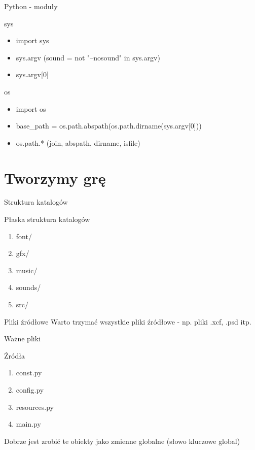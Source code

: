 \documentclass{beamer}
\begin{document}
\begin{frame}{Python - moduły}
  \begin{block}{sys}
    \begin{itemize}
    \item import sys
    \item sys.argv (sound = not "--nosound" in sys.argv)
    \item sys.argv[0]
    \end{itemize}
  \end{block}

  \begin{block}{os}
    \begin{itemize}
    \item import os
    \item base\_path = os.path.abspath(os.path.dirname(sys.argv[0]))
    \item os.path.* (join, abspath, dirname, isfile)
    \end{itemize}
  \end{block}

\end{frame}


\section{Tworzymy grę}

\begin{frame}{Struktura katalogów}
  \begin{block}{Płaska struktura katalogów}
    \begin{enumerate}
    \item font/
    \item gfx/
    \item music/
    \item sounds/
    \item src/
    \end{enumerate}
  \end{block}

  \begin{alertblock}{Pliki źródłowe}
    Warto trzymać wszystkie pliki źródłowe - np. pliki .xcf, .psd itp.
  \end{alertblock}
\end{frame}

\begin{frame}{Ważne pliki}
  \begin{block}{Źródła}
    \begin{enumerate}
    \item const.py
    \item config.py
    \item resources.py
    \item main.py
    \end{enumerate}
  \end{block}

  \begin{alertblock}
    Dobrze jest zrobić te obiekty jako zmienne globalne (słowo
    kluczowe \alert{global})
  \end{alertblock}
\end{frame}
\end{document}
